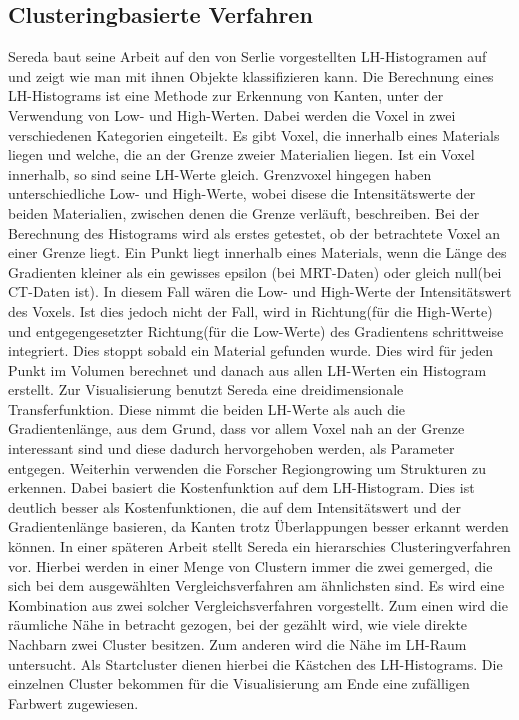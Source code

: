 \subsection{Clusteringbasierte Verfahren}


Sereda baut seine Arbeit \cite{sereda2006visualization} auf den von Serlie \cite{serlie2003computed} vorgestellten LH-Histogramen auf und zeigt wie man mit ihnen Objekte klassifizieren kann.
\newline
Die Berechnung eines LH-Histograms ist eine Methode zur Erkennung von Kanten, unter der Verwendung von Low- und High-Werten. Dabei werden die Voxel in zwei verschiedenen Kategorien eingeteilt. Es gibt Voxel, die  innerhalb eines Materials liegen und welche, die  an der Grenze zweier Materialien liegen. Ist ein Voxel innerhalb, so sind seine LH-Werte gleich. Grenzvoxel hingegen haben unterschiedliche Low- und High-Werte, wobei disese die Intensitätswerte der beiden Materialien, zwischen denen die Grenze verläuft, beschreiben. 
\newline
Bei der Berechnung des Histograms wird als erstes getestet, ob der betrachtete Voxel an einer Grenze liegt. Ein Punkt liegt innerhalb eines Materials, wenn  die Länge des Gradienten kleiner als ein gewisses epsilon (bei MRT-Daten) oder gleich null(bei CT-Daten ist). In diesem Fall wären die Low- und High-Werte der Intensitätswert des Voxels. Ist dies jedoch nicht der Fall, wird in Richtung(für die High-Werte) und entgegengesetzter Richtung(für die Low-Werte) des Gradientens schrittweise integriert. Dies stoppt sobald ein Material gefunden wurde. Dies wird für jeden Punkt im Volumen berechnet und danach aus allen LH-Werten ein Histogram erstellt.
\newline 
Zur Visualisierung benutzt Sereda eine dreidimensionale Transferfunktion. Diese nimmt die beiden LH-Werte als auch die Gradientenlänge, aus dem Grund, dass vor allem Voxel nah an der Grenze interessant sind und diese dadurch hervorgehoben werden, als Parameter entgegen.
\newline
Weiterhin verwenden die Forscher Regiongrowing um Strukturen zu erkennen. Dabei basiert die Kostenfunktion auf dem LH-Histogram. Dies ist deutlich besser als Kostenfunktionen, die auf dem Intensitätswert und der Gradientenlänge basieren, da Kanten trotz Überlappungen besser erkannt werden können.
\newline
\newline
In einer späteren Arbeit \cite{sereda2006automating} stellt Sereda ein hierarschies Clusteringverfahren vor. Hierbei werden in einer Menge von Clustern immer die zwei gemerged, die sich bei dem ausgewählten Vergleichsverfahren am ähnlichsten sind. Es wird eine Kombination aus zwei solcher Vergleichsverfahren vorgestellt. Zum einen wird die räumliche Nähe in betracht gezogen, bei der gezählt wird, wie viele direkte Nachbarn zwei Cluster besitzen. Zum anderen wird die Nähe im LH-Raum untersucht. Als Startcluster dienen hierbei die Kästchen des LH-Histograms. Die einzelnen Cluster bekommen für die Visualisierung am Ende eine zufälligen Farbwert zugewiesen. 



